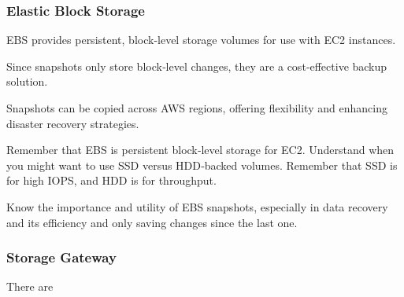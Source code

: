 \subsubsection{Elastic Block Storage}

\quotesinglbase EBS provides persistent, block-level storage volumes for use with EC2 instances.

Since snapshots only store block‑level changes,
they are a cost‑effective backup solution.

Snapshots can be copied across AWS regions, offering flexibility
and enhancing disaster recovery strategies.

Remember that EBS is persistent block‑level storage for EC2.
Understand when you might want to use SSD versus HDD‑backed volumes.
Remember that SSD is for high IOPS, and HDD is for throughput.

Know the importance and utility of EBS snapshots,
especially in data recovery and its efficiency and only saving
changes since the last one.

\subsubsection{Storage Gateway}

There are

